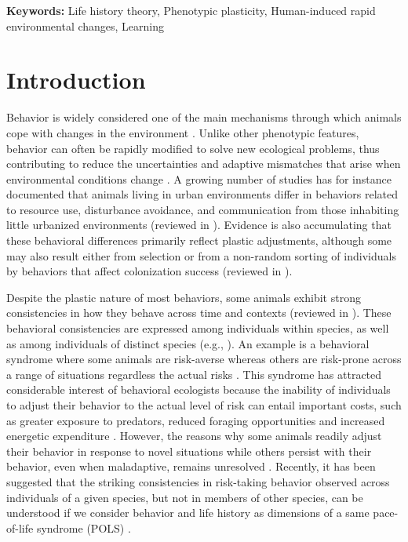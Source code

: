 \bigskip
\textbf{Keywords:} Life history theory, Phenotypic plasticity, Human-induced rapid
environmental changes, Learning

\clearpage


\section{Introduction}

Behavior is widely considered one of the main mechanisms
through which animals cope with changes in the environment
\citep{Bogert1949, Klopfer1962, mayr1965}. Unlike other phenotypic
features, behavior can often be rapidly modified to solve
new ecological problems, thus contributing to reduce the uncertainties
and adaptive mismatches that arise when environmental 
conditions change \citep{Huey2003, Price2003, Estrada2016, Sol2016}. 
A growing number
of studies has for instance documented that animals living
in urban environments differ in behaviors related to resource
use, disturbance avoidance, and communication from those
inhabiting little urbanized environments (reviewed in 
\citet{Shochat2006, Evans2012, Lowry2013, Sol2013a}). 
Evidence is also accumulating that these behavioral differences
primarily reflect plastic adjustments, although some
may also result either from selection or from a non-random
sorting of individuals by behaviors that affect colonization success
(reviewed in \citet{Sol2013a}).

Despite the plastic nature of most behaviors, some animals
exhibit strong consistencies in how they behave across time
and contexts (reviewed in \cite{Sih2004, Reale2007}).
These behavioral consistencies are expressed among individuals
within species, as well as among individuals of distinct
species (e.g., \citet{Moller1994, Verbeek1994, Koolhaas1999, Gosling2001, Greenberg2003, Sih2004, Reale2007}).
An example is a behavioral syndrome where
some animals are risk-averse whereas others are risk-prone
across a range of situations regardless the actual risks \citep{Sih2004, Sih2012a}.
This syndrome has attracted considerable
interest of behavioral ecologists because the inability of individuals
to adjust their behavior to the actual level of risk can
entail important costs, such as greater exposure to predators,
reduced foraging opportunities and increased energetic expenditure
\citep{Sih2004, Sih2012a}. However, the reasons why some
animals readily adjust their behavior in response to novel situations
while others persist with their behavior, even when maladaptive,
remains unresolved \citep{Sih2004}. Recently, it has
been suggested that the striking consistencies in risk-taking
behavior observed across individuals of a given species, but
not in members of other species, can be understood if we consider
behavior and life history as dimensions of a same pace-of-life
syndrome (POLS) \citep{Wolf2007, Reale2010a}.

